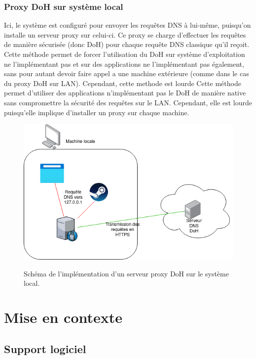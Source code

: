 \documentclass[a4paper,12pt]{article}
\begin{document}
	\subsubsection{Proxy DoH sur système local}
	
	Ici, le système est configuré pour envoyer les requêtes DNS à lui-même, puisqu'on installe un serveur proxy sur celui-ci. Ce proxy se charge d'effectuer les requêtes de manière sécurisée (donc DoH) pour chaque requête DNS classique qu'il reçoit.
	Cette méthode permet de forcer l'utilisation du DoH sur système d'exploitation ne l'implémentant pas et sur des applications ne l'implémentant pas également, sans pour autant devoir faire appel a une machine extérieure (comme dans le cas du proxy DoH sur LAN).
	Cependant, cette methode est lourde 
	Cette méthode permet d'utiliser des applications n'implémentant pas le DoH de manière native sans compromettre la sécurité des requêtes sur le LAN. Cependant, elle est lourde puisqu'elle implique d'installer un proxy sur chaque machine.
	
	\begin{figure}[H]
		\begin{center}
			{\includegraphics[scale=0.6]{Images/schema_doh_proxy_local.png}}
		\end{center}
		\caption{Schéma de l'implémentation d'un serveur proxy DoH sur le système local.}
	\end{figure}

	\section{Mise en contexte}
	
	\subsection{Support logiciel}
	
\end{document}
